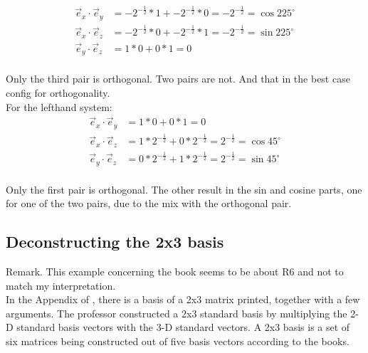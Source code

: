 \documentclass[a4paper]{article}
\begin{document}
\begin{Example}
\begin{PropositionOpt4}
\begin{displaymath}
\begin{align}
\vec{e}_{x}\cdot\vec{e}_{y} &= -2^{-\frac12}*1 + -2^{-\frac12}*0 = -2^{-\frac12} = \cos225^{\circ}\\
\vec{e}_{x}\cdot\vec{e}_{z} &= -2^{-\frac12}*0 + -2^{-\frac12}*1 = -2^{-\frac12} = \sin225^{\circ}\\
\vec{e}_{y}\cdot\vec{e}_{z} &= 1*0+0*1 = 0\\
\end{align}
\end{displaymath}

Only the third pair is orthogonal. Two pairs are not. And that in the best case config for orthogonality.\\

For the lefthand system:\\

\begin{displaymath}
\begin{align}
\vec{e}_{x}\cdot\vec{e}_{y} &= 1*0+0*1 = 0\\
\vec{e}_{x}\cdot\vec{e}_{z} &= 1*2^{-\frac12} + 0*2^{-\frac12} = 2^{-\frac12} = \cos45^{\circ}\\
\vec{e}_{y}\cdot\vec{e}_{z} &= 0*2^{-\frac12} + 1*2^{-\frac12} = 2^{-\frac12} = \sin45^{\circ}\\
\end{align}
\end{displaymath}

Only the first pair is orthogonal. The other result in the sin and cosine parts, one for one of the two pairs, due to the mix with the orthogonal pair.\\

\subsection{Deconstructing the 2x3 basis} 


Remark. This example concerning the book \cite{Strang1} seems to be about R6 and not to match my interpretation.\\

In the Appendix of \cite{Strang1}, there is a basis of a 2x3 matrix printed, together with a few arguments. The professor constructed a 2x3 standard basis by multiplying the 2-D standard basis vectors with the 3-D standard vectors. A 2x3 basis is a set of six matrices being constructed out of five basis vectors according to the books. \\


\end{PropositionOpt4}
\end{Example}
\end{document}
